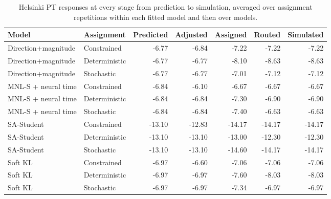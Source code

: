 \begin{table}[pos=htbp]
\centering\small
\caption{Helsinki PT responses at every stage from prediction to simulation, averaged over assignment repetitions within each fitted model and then over models.}
\label{tab:execution_layers}
\setlength{\tabcolsep}{3pt}
\renewcommand{\arraystretch}{1.12}
\begin{tabular*}{\linewidth}{@{\extracolsep{\fill}}llrrrrr@{}}
\toprule
Model & Assignment & Predicted & Adjusted & Assigned & Routed & Simulated \\
\midrule
Direction+magnitude & Constrained & -6.77 & -6.84 & -7.22 & -7.22 & -7.22 \\
Direction+magnitude & Deterministic & -6.77 & -6.77 & -8.10 & -8.63 & -8.63 \\
Direction+magnitude & Stochastic & -6.77 & -6.77 & -7.01 & -7.12 & -7.12 \\
MNL-S + neural time & Constrained & -6.84 & -6.10 & -6.67 & -6.67 & -6.67 \\
MNL-S + neural time & Deterministic & -6.84 & -6.84 & -7.30 & -6.90 & -6.90 \\
MNL-S + neural time & Stochastic & -6.84 & -6.84 & -7.40 & -6.63 & -6.63 \\
SA-Student & Constrained & -13.10 & -12.83 & -14.17 & -14.17 & -14.17 \\
SA-Student & Deterministic & -13.10 & -13.10 & -13.00 & -12.30 & -12.30 \\
SA-Student & Stochastic & -13.10 & -13.10 & -14.60 & -14.17 & -14.17 \\
Soft KL & Constrained & -6.97 & -6.60 & -7.06 & -7.06 & -7.06 \\
Soft KL & Deterministic & -6.97 & -6.97 & -7.60 & -8.03 & -8.03 \\
Soft KL & Stochastic & -6.97 & -6.97 & -7.34 & -6.97 & -6.97 \\
\bottomrule
\end{tabular*}
\par{}
\end{table}
